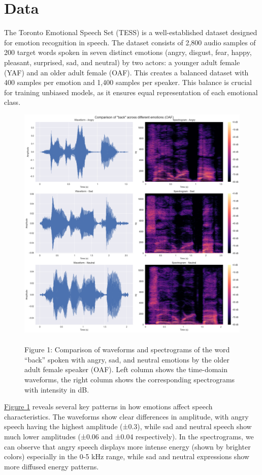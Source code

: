 \documentclass[../main.tex]{subfiles}
\begin{document}
\section{Data}
The Toronto Emotional Speech Set (TESS) is a well-established dataset
designed for emotion recognition in speech. The dataset consists of 2,800
audio samples of 200 target words spoken in seven distinct emotions
(angry, disgust, fear, happy, pleasant, surprised, sad, and neutral)
by two actors: a younger adult female (YAF) and an older adult female (OAF).
This creates a balanced dataset with 400 samples per emotion and 1,400
samples per speaker. This balance is crucial for training unbiased models,
as it ensures equal representation of each emotional class.
\begin{figure}[h]
    \centering
    \includegraphics[width= 350pt]{../resources/tess_analysis.png}
    \caption{\\Figure 1: Comparison of waveforms and spectrograms of the word ``back'' spoken with angry, sad, and neutral emotions by the older adult female speaker (OAF). Left column shows the time-domain waveforms, the right column shows the corresponding spectrograms with intensity in dB.}
    \label{fig:analysis}
\end{figure}
\hyperref[fig:analysis]{Figure 1} reveals several key patterns in how emotions affect
speech characteristics. The waveforms show clear differences in amplitude, with
angry speech having the highest amplitude (±0.3), while sad and neutral speech
show much lower amplitudes (±0.06 and ±0.04 respectively). In the spectrograms,
we can observe that angry speech displays more intense energy
(shown by brighter colors) especially in the 0-5 kHz range, while sad and
neutral expressions show more diffused energy patterns.
\end{document}
